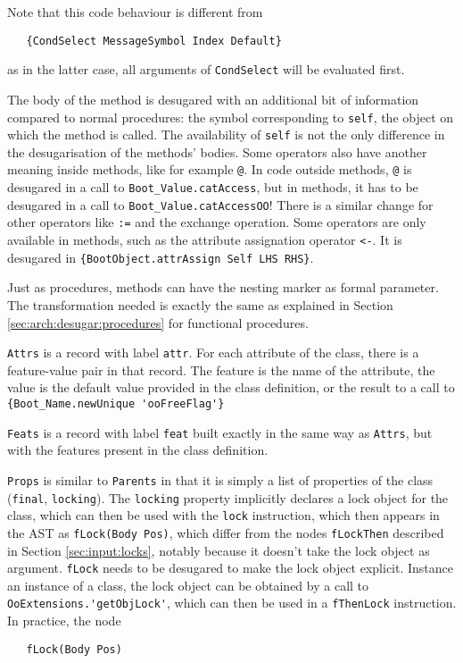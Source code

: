 \documentclass[a4paper]{memoir}
\begin{document}
Note that this code behaviour is different from 
\begin{lstlisting}
   {CondSelect MessageSymbol Index Default}
\end{lstlisting}
as in the latter case, all arguments of \lstinline!CondSelect! will be evaluated
first. 

The body of the method is desugared with an additional bit of information compared to normal procedures: the symbol corresponding to \lstinline!self!, the object on which the method is called. 
The availability of \lstinline!self! is not the only difference in the desugarisation of the methods' bodies. Some operators also have another meaning inside methods, like for example \lstinline!@!.
In code outside methods, \lstinline!@! is desugared in a call to
\lstinline!Boot_Value.catAccess!, but in methods, it has to be desugared in a
call to \lstinline!Boot_Value.catAccessOO!! There is a similar change for other
operators like \lstinline!:=! and the exchange operation.
Some operators are only available in methods, such as the attribute assignation
operator \lstinline!<-!. It is desugared in 
\lstinline!{BootObject.attrAssign Self LHS RHS}!.

Just as procedures, methods can have the nesting marker as formal parameter. The transformation needed
is exactly the same as explained in Section \ref{sec:arch:desugar:procedures} for functional procedures.

\lstinline!Attrs! is a record with label \lstinline!attr!.
For each attribute of the class, there is a feature-value pair in that record.
The feature is the name of the attribute, the value is the default value
provided in the class definition, or the result to a call to
\lstinline!{Boot_Name.newUnique 'ooFreeFlag'}!

\lstinline!Feats! is a record with label \lstinline!feat! built exactly in the
same way as \lstinline!Attrs!, but with the features present in the class
definition.

\lstinline!Props! is similar to \lstinline!Parents! in that it is simply a list of properties of the class (\lstinline!final!,
\lstinline!locking!). The \lstinline!locking! property implicitly declares a
lock object for the class, which can then be used with the \lstinline!lock!
instruction, which then appears in the AST as \lstinline!fLock(Body Pos)!, which
differ from the nodes \lstinline!fLockThen! described in Section
\ref{sec:input:locks}, notably because it doesn't take the lock object as
argument. \lstinline!fLock!
needs to be desugared to make the lock object explicit. Instance an instance of
a class, the lock object can be obtained by a call to
\lstinline!OoExtensions.'getObjLock'!, which can then be used in a
\lstinline!fThenLock! instruction. In practice, the node
\label{desugar:classes:lock}
\begin{lstlisting}
   fLock(Body Pos)
\end{lstlisting}
\end{document}

